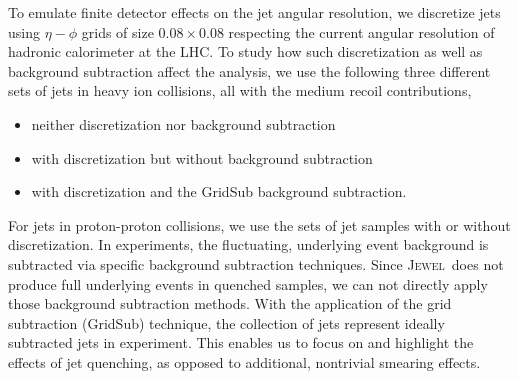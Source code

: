 \documentclass[notoc]{JHEP3}
\newcommand{\jw}{\textsc{Jewel}~}
\begin{document}

To emulate finite detector effects on the jet angular resolution, we discretize jets using $\eta-\phi$ grids of size $0.08 \times 0.08$ respecting the current angular resolution of hadronic calorimeter at the LHC. To study how such discretization as well as background subtraction affect the analysis, we use the following three different sets of jets in heavy ion collisions, all with the medium recoil contributions,
\begin{itemize}
	\item neither discretization nor background subtraction
	\item with discretization but without background subtraction
	\item with discretization and the GridSub \cite{KunnawalkamElayavalli:2017hxo} background subtraction.
\end{itemize}
For jets in proton-proton collisions, we use the sets of jet samples with or without discretization. In experiments, the fluctuating, underlying event background is subtracted via specific background subtraction techniques. Since \jw does not produce full underlying events in quenched samples, we can not directly apply those background subtraction methods. With the application of the grid subtraction (GridSub) technique, the collection of jets represent ideally subtracted jets in experiment. This enables us to focus on and highlight the effects of jet quenching, as opposed to additional, nontrivial smearing effects.
\end{document}
